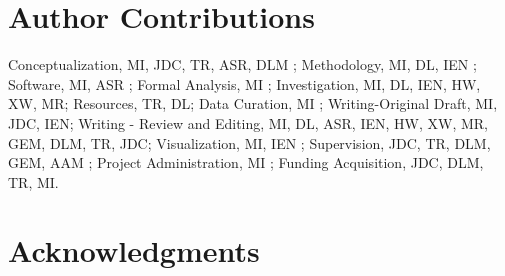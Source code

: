 \documentclass[9pt,lineno]{elife}
\begin{document}
\section{Author Contributions}

Conceptualization, MI, JDC, TR, ASR, DLM  ; Methodology, MI, DL, IEN ; Software, MI, ASR ; Formal Analysis, MI ; Investigation, MI, DL, IEN, HW, XW, MR; Resources, TR, DL;  Data Curation, MI ; Writing-Original Draft, MI, JDC, IEN; Writing - Review and Editing, MI, DL, ASR, IEN, HW, XW, MR, GEM, DLM, TR, JDC; Visualization, MI, IEN ; Supervision, JDC, TR, DLM, GEM, AAM ; Project Administration, MI ; Funding Acquisition, JDC, DLM, TR, MI. 


\section{Acknowledgments}
\end{document}
